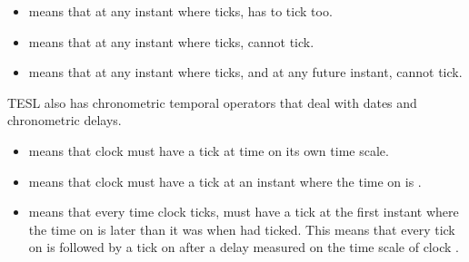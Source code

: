 \begin{isabellebody}
\begin{isamarkuptext}
%
\begin{itemize}%
\item {} means that at any instant where  ticks,  has to tick too.

\item {} means that at any instant where  ticks,  cannot tick.

\item {} means that at any instant where  ticks, and at any future instant, 
 cannot tick.%
\end{itemize}%
\end{isamarkuptext}\isamarkuptrue%
%
\isadelimdocument
%
\endisadelimdocument
%
\isatagdocument
%
\isamarkuptrue%
%
\endisatagdocument
{\isafolddocument}%
%
\isadelimdocument
%
\endisadelimdocument
%
\begin{isamarkuptext}%
TESL also has chronometric temporal operators that deal with dates and chronometric delays.

%
\begin{itemize}%
\item {} means that clock  must have a tick at time  on its own time scale.

\item {} means that clock  must have a tick at an instant where the time 
on  is .

\item {} means that every time clock  ticks,  must have 
a tick at the first instant where the time on  is  later than it was when  had ticked.
This means that every tick on  is followed by a tick on  after a delay  measured
on the time scale of clock .


\end{itemize}
\end{isamarkuptext}
\end{isabellebody}
